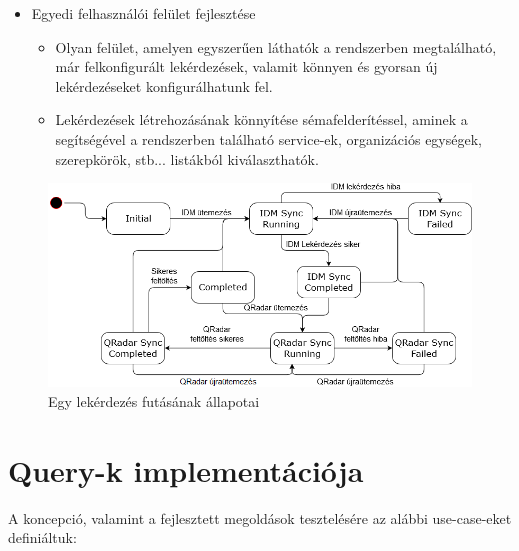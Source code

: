 \begin{itemize}
	\item Egyedi felhasználói felület fejlesztése
	\begin{itemize}
		\item Olyan felület, amelyen egyszerűen láthatók a rendszerben megtalálható, már felkonfigurált lekérdezések, valamit könnyen és gyorsan új lekérdezéseket konfigurálhatunk fel.
		\item Lekérdezések létrehozásának könnyítése sémafelderítéssel, aminek a segítségével a rendszerben található service-ek, organizációs egységek, szerepkörök, stb... listákból kiválaszthatók.
	\end{itemize}
\end{itemize}

\begin{figure}
	\centering
	\includegraphics[width=0.9\linewidth]{figures/refloader_states}
	\caption{Egy lekérdezés futásának állapotai}
	\label{fig:refloaderstates}
\end{figure}


\section{Query-k implementációja} \label{sec:queryk}
A koncepció, valamint a fejlesztett megoldások tesztelésére az alábbi use-case-eket definiáltuk:


